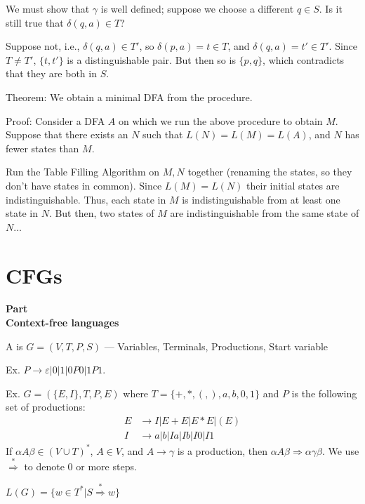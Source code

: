 \begin{frame}
We must show that $\gamma$ is well defined; suppose we choose a
different $q\in S$.  Is it still true that $\delta(q,a)\in T$?

Suppose not, i.e., $\delta(q,a)\in T'$, so $\delta(p,a)=t\in T$, and
$\delta(q,a)=t'\in T'$.  Since $T\neq T'$, $\{t,t'\}$ is a
distinguishable pair.  But then so is $\{p,q\}$, which contradicts
that they are both in $S$.

Theorem: We obtain a minimal DFA from the procedure.

Proof:  Consider a DFA $A$ on which we run the above procedure to
obtain $M$.  Suppose that there exists an $N$ such that
$L(N)=L(M)=L(A)$, and $N$ has fewer states than $M$.

Run the Table Filling Algorithm on $M,N$ together (renaming the
states, so they don't have states in common).  Since $L(M)=L(N)$ their
initial states are indistinguishable.  Thus, each state in $M$ is
indistinguishable from at least one state in $N$.  But then, two
states of $M$ are indistinguishable from the same state of $N\ldots$
\end{frame}

\section{CFGs}

\begin{frame}
\begin{center}
\addtocounter{part}{1}
{\bf Part  \\ Context-free languages}
\end{center}
\end{frame}

\begin{frame}
A  is $G=(V,T,P,S)$
--- Variables, Terminals, Productions, Start variable

Ex. $P\longrightarrow\varepsilon|0|1|0P0|1P1$.

Ex. $G=(\{E,I\},T,P,E)$ where $T=\{+,*,(,),a,b,0,1\}$ and $P$ is the
following set of productions:
\begin{align*}
E & \longrightarrow I|E+E|E*E|(E) \\
I & \longrightarrow a|b|Ia|Ib|I0|I1
\end{align*}
If $\alpha A\beta\in(V\cup T)^*$, $A\in V$, and
$A\longrightarrow\gamma$ is a production, then $\alpha
A\beta\Rightarrow\alpha\gamma\beta$.  We use
$\stackrel{*}{\Rightarrow}$ to denote 0 or more steps.

$L(G)=\{w\in T^*|S\stackrel{*}{\Rightarrow}w\}$
\end{frame}

